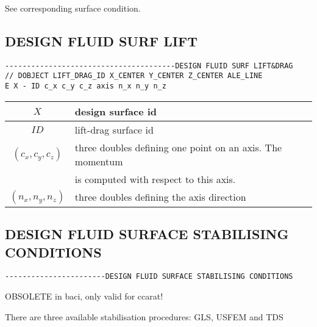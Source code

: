 See corresponding surface condition.

\subsection{DESIGN FLUID SURF LIFT}
\begin{verbatim}
---------------------------------------DESIGN FLUID SURF LIFT&DRAG
// DOBJECT LIFT_DRAG_ID X_CENTER Y_CENTER Z_CENTER ALE_LINE
E X - ID c_x c_y c_z axis n_x n_y n_z
\end{verbatim}

\begin{center}
\begin{tabular}{c||l}
$X$                        & design surface id \\ \hline
$ID$                       & lift-drag surface id \\ \hline
$\left(c_x,c_y,c_z\right)$ & three doubles defining one point on an axis. The momentum  \\
                           & is computed with respect to this axis. \\\hline
$\left(n_x,n_y,n_z\right)$ & three doubles defining the axis direction \\\hline
\end{tabular}
\end{center}

\subsection{DESIGN FLUID SURFACE STABILISING CONDITIONS}
\begin{verbatim}
-----------------------DESIGN FLUID SURFACE STABILISING CONDITIONS
\end{verbatim}

OBSOLETE in baci, only valid for ccarat!

There are three available stabilisation procedures: GLS, USFEM and TDS
